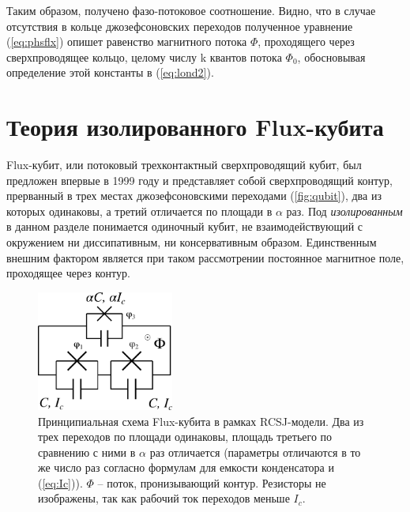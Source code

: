 \documentclass[12pt, twoside]{report}
\numberwithin{equation}{section}
\numberwithin{figure}{section}
\begin{document}
Таким образом, получено фазо-потоковое соотношение. Видно, что в случае отсутствия в кольце джозефсоновских переходов полученное уравнение (\ref{eq:phsflx}) опишет равенство магнитного потока $\Phi$, проходящего через сверхпроводящее кольцо, целому числу  k квантов потока $\Phi_0$, обосновывая определение этой константы в (\ref{eq:lond2}).


\section{Теория изолированного Flux-кубита}
Flux-кубит, или потоковый трехконтактный сверхпроводящий кубит, был предложен впервые в 1999 году\cite{Orlando1999} и представляет собой сверхпроводящий контур, прерванный в трех местах джозефсоновскими переходами (\autoref{fig:qubit}), два из которых одинаковы, а третий отличается по площади в $\alpha$ раз. Под \textit{изолированным} в данном разделе понимается одиночный кубит, не взаимодействующий с окружением ни диссипативным, ни консервативным образом. Единственным внешним фактором является при таком рассмотрении постоянное магнитное поле, проходящее через контур.

\begin{figure}
\centering
\includegraphics[width=0.4\textwidth]{Pictures/qubit}
\caption{Принципиальная схема Flux-кубита в рамках RCSJ-модели. Два из трех переходов по площади одинаковы, площадь третьего по сравнению с ними в $\alpha$ раз отличается (параметры отличаются в то же число раз согласно формулам для емкости конденсатора и (\ref{eq:Ic})). $\Phi$ -- поток, пронизывающий контур. Резисторы не изображены, так как рабочий ток переходов меньше $I_c$.}
\label{fig:qubit}
\end{figure}
\end{document}
